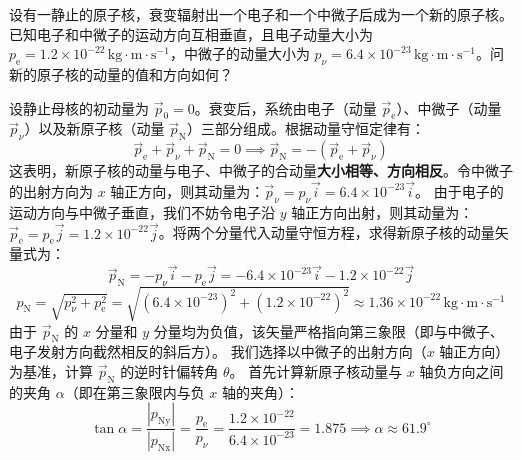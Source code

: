 \documentclass[lang=cn,11pt]{elegantbook}
\begin{document}
\begin{example}
设有一静止的原子核，衰变辐射出一个电子和一个中微子后成为一个新的原子核。已知电子和中微子的运动方向互相垂直，且电子动量大小为 $p_{\text{e}} = 1.2 \times 10^{-22}\,\mathrm{kg \cdot m \cdot s^{-1}}$，中微子的动量大小为 $p_{\nu} = 6.4 \times 10^{-23}\,\mathrm{kg \cdot m \cdot s^{-1}}$。问新的原子核的动量的值和方向如何？
\end{example}
\begin{solution}
设静止母核的初动量为 $\vec{p}_0 = 0$。衰变后，系统由电子（动量 $\vec{p}_{\text{e}}$）、中微子（动量 $\vec{p}_{\nu}$）以及新原子核（动量 $\vec{p}_{\text{N}}$）三部分组成。根据动量守恒定律有：
\[\vec{p}_{\text{e}} + \vec{p}_{\nu} + \vec{p}_{\text{N}} = 0 \implies \vec{p}_{\text{N}} = -(\vec{p}_{\text{e}} + \vec{p}_{\nu})\]
这表明，新原子核的动量与电子、中微子的合动量\textbf{大小相等、方向相反}。令中微子的出射方向为 $x$ 轴正方向，则其动量为：$\vec{p}_{\nu} = p_{\nu}\vec{i} = 6.4 \times 10^{-23}\vec{i}$。
由于电子的运动方向与中微子垂直，我们不妨令电子沿 $y$ 轴正方向出射，则其动量为：$\vec{p}_{\text{e}} = p_{\text{e}}\vec{j} = 1.2 \times 10^{-22}\vec{j}$。将两个分量代入动量守恒方程，求得新原子核的动量矢量式为：
\[\vec{p}_{\text{N}} = -p_{\nu}\vec{i} - p_{\text{e}}\vec{j} = -6.4 \times 10^{-23}\vec{i} - 1.2 \times 10^{-22}\vec{j}\]
\[p_{\text{N}} = \sqrt{p_{\nu}^2 + p_{\text{e}}^2} = \sqrt{(6.4 \times 10^{-23})^2 + (1.2 \times 10^{-22})^2} \approx 1.36 \times 10^{-22}\,\mathrm{kg \cdot m \cdot s^{-1}}\]
由于 $\vec{p}_{\text{N}}$ 的 $x$ 分量和 $y$ 分量均为负值，该矢量严格指向第三象限（即与中微子、电子发射方向截然相反的斜后方）。
我们选择以中微子的出射方向（$x$ 轴正方向）为基准，计算 $\vec{p}_{\text{N}}$ 的逆时针偏转角 $\theta$。
首先计算新原子核动量与 $x$ 轴负方向之间的夹角 $\alpha$（即在第三象限内与负 $x$ 轴的夹角）：
\[\tan\alpha = \frac{|p_{\text{Ny}}|}{|p_{\text{Nx}}|} = \frac{p_{\text{e}}}{p_{\nu}} = \frac{1.2 \times 10^{-22}}{6.4 \times 10^{-23}} = 1.875 \implies \alpha \approx 61.9^\circ\]
\end{solution}
\end{document}
